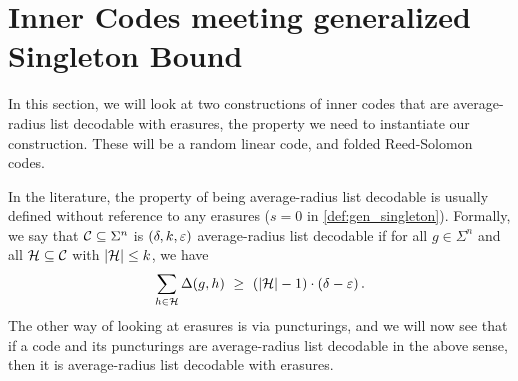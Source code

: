 \section{Inner Codes meeting generalized Singleton Bound}\label{sec:inner-code}

In this section, we will look at two constructions of inner codes that are average-radius list decodable with erasures, the property we need to instantiate our construction. These will be a random linear code, and folded Reed-Solomon codes.

In the literature, the property of being average-radius list decodable is usually defined without reference to any erasures (\ie $s=0$ in \cref{def:gen_singleton}). Formally, we say that ${\mathcal C} \subseteq \Sigma^n$ is $(\delta,k,\varepsilon)$ { average-radius list decodable} if for all $g \in \Sigma^n$ and all ${\mathcal H} \subseteq {\mathcal C}$ with $\lvert{\mathcal H}\rvert \leq k$, we have
%
\[
\sum_{h \in {\mathcal H}}{\Delta(g,h)} ~\geq~ \left(\lvert{\mathcal H}\rvert-1\right) \cdot (\delta - \varepsilon) \,.
\]
%
The other way of looking at erasures is via puncturings, and we will now see that if a code and its puncturings are average-radius list decodable in the above sense, then it is average-radius list decodable with erasures.  


\vspace{-5 pt}
